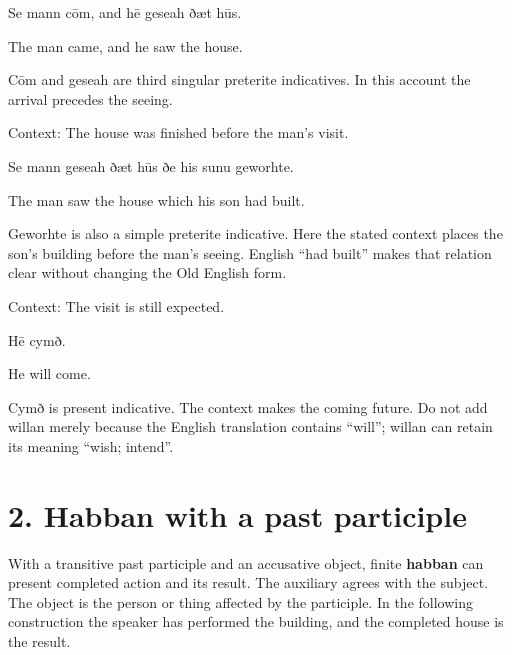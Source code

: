 Se mann cōm, and hē geseah ðæt hūs.

The man came, and he saw the house.

Cōm and geseah are third singular preterite indicatives. In this account the arrival precedes the seeing.

Context: The house was finished before the man’s visit.

Se mann geseah ðæt hūs ðe his sunu geworhte.

The man saw the house which his son had built.

Geworhte is also a simple preterite indicative. Here the stated context places the son’s building before the man’s seeing. English “had built” makes that relation clear without changing the Old English form.

Context: The visit is still expected.

Hē cymð.

He will come.

Cymð is present indicative. The context makes the coming future. Do not add willan merely because the English translation contains “will”; willan can retain its meaning “wish; intend”.

\section*{2. Habban with a past participle}

With a transitive past participle and an accusative object, finite \textbf{habban} can present completed action and its result. The auxiliary agrees with the subject. The object is the person or thing affected by the participle. In the following construction the speaker has performed the building, and the completed house is the result.

